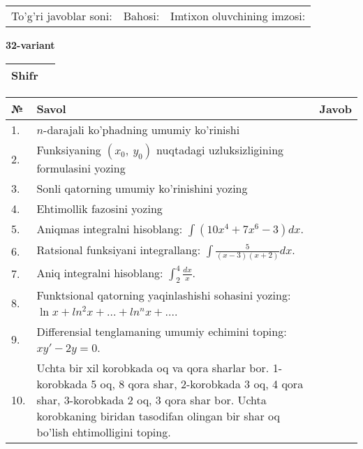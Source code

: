 \documentclass{article}
\begin{document}
  \vspace{1cm}
  
  \begin{tabular}{lll}
  To'g'ri javoblar soni: \underline{\hspace{1.5cm}} & 
  Bahosi: \underline{\hspace{1.5cm}} & 
  Imtixon oluvchining imzosi: \underline{\hspace{2cm}} \\
  \end{tabular}
  
  \egroup
  
  \newpage
  
  
  \textbf{32-variant}\\
  
  \bgroup
  \def\arraystretch{1.6} %
  
  \begin{tabular}{|m{5.7cm}|m{9.5cm}|}
  \hline
  Shifr & \\
  \hline
  \end{tabular}
  
  \vspace{1cm}
  
  \begin{tabular}{|m{0.7cm}|m{10cm}|m{4cm}|}
  \hline
  № & Savol & Javob \\
  \hline
  1. & \(n\)-darajali ko'phadning umumiy ko'rinishi &  \\
  \hline
  2. & Funksiyaning \((x_{0},\ y_{0})\) nuqtadagi uzluksizligining formulasini yozing &  \\
  \hline
  3. & Sonli qatorning umumiy ko'rinishini yozing &  \\
  \hline
  4. & Ehtimollik fazosini yozing &  \\
  \hline
  5. & Aniqmas integralni hisoblang: \(\int {\left( 10x^{4} + 7x^{6} - 3 \right)dx}\). &  \\
  \hline
  6. & Ratsional funksiyani integrallang: \(\int {\frac{5}{(x - 3)(x + 2)}dx}\). &  \\
  \hline
  7. & Aniq integralni hisoblang: \(\int_{2}^{4}\frac{dx}{x}\). &  \\
  \hline
  8. & Funktsional qatorning yaqinlashishi sohasini yozing: \(\ln x + ln^{2}x + ... + ln^{n}x + ...\). &  \\
  \hline
  9. & Differensial tenglamaning umumiy echimini toping: \(xy' - 2y = 0\). &  \\
  \hline
  10. & Uchta bir xil korobkada oq va qora sharlar bor. 1-korobkada 5 oq, 8 qora shar, 2-korobkada 3 oq, 4 qora shar, 3-korobkada 2 oq, 3 qora shar bor. Uchta korobkaning biridan tasodifan olingan bir shar oq bo'lish ehtimolligini toping. &  \\
  \hline
  \end{tabular}
  
\end{document}
